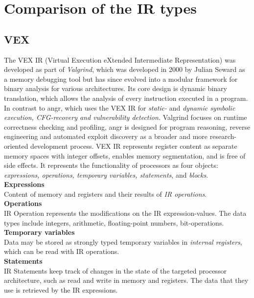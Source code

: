 \documentclass[seminar]{plai}
\begin{document}
\section{Comparison of the IR types}
\label{sec:comparison-of-the-ir-types}

\subsection{VEX}
\label{sec:vex-comparison-of-IRs}
The VEX IR (Virtual Execution eXtended Intermediate Representation) was developed as part of \textit{Valgrind}, which was developed in 2000 by Julian Seward as a memory debugging tool but has since evolved into a modular framework for binary analysis for various architectures. Its core design is dynamic binary translation, which allows the analysis of every instruction executed in a program. In contrast to angr, which uses the VEX IR for \textit{static-} and \textit{dynamic symbolic execution, CFG-recovery and vulnerability detection.}
Valgrind focuses on runtime correctness checking and profiling, angr is designed for program reasoning, reverse engineering and automated exploit discovery as a broader and more research-oriented development process.
VEX IR represents register content as separate memory spaces with integer offsets, enables memory segmentation, and is free of side effects.
It represents the functionality of processors as four objects: \textit{expressions, operations, temporary variables, statements}, and \textit{blocks}. \cite{Valgrind-A-Framework-for-Heavyweight-Dynamic-Binary-Instrumentation,pyvex-documentation}\\

\noindent\textbf{Expressions}\\
Content of memory and registers and their results of \textit{IR operations}.\\

\noindent\textbf{Operations}\\
IR Operation represents the modifications on the IR expression-values.
The data types include integers, arithmetic, floating-point numbers, bit-operations.\\

\noindent\textbf{Temporary variables}\\
Data may be stored as strongly typed temporary variables in \textit{internal registers}, which can be read with IR operations.\\

\noindent\textbf{Statements}\\
IR Statements keep track of changes in the state of the targeted processor architecture, such as read and write in memory and registers. The data that they use is retrieved by the IR expressions.\\
\end{document}
